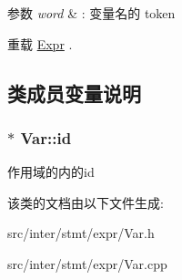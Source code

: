 \begin{DoxyParams}{参数}
{\em word} & \+: 变量名的 token \\
\hline
\end{DoxyParams}


重载 \hyperlink{class_expr}{Expr} .



\subsection{类成员变量说明}
\subsubsection[{\texorpdfstring{id}{id}}]{$\ast$ Var\+::id}\hypertarget{class_var_a3e5c7c9425da4659290da5c0553c7dc6}{}\label{class_var_a3e5c7c9425da4659290da5c0553c7dc6}
作用域的内的id 

该类的文档由以下文件生成\+:\begin{DoxyCompactItemize}
\item 
src/inter/stmt/expr/Var.\+h\item 
src/inter/stmt/expr/Var.\+cpp\end{DoxyCompactItemize}
